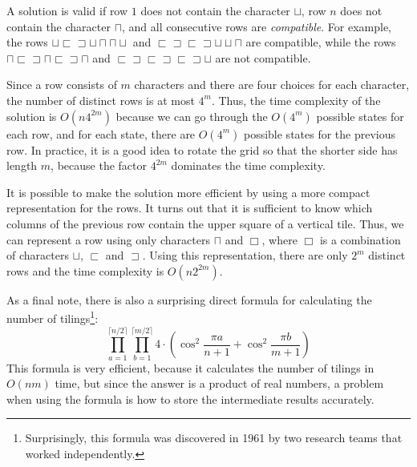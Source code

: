 A solution is valid if row $1$ does not contain
the character $\sqcup$,
row $n$ does not contain the character $\sqcap$,
and all consecutive rows are \emph{compatible}.
For example, the rows
$\sqcup \sqsubset \sqsupset \sqcup \sqcap \sqcap \sqcup$ and
$\sqsubset \sqsupset \sqsubset \sqsupset \sqcup \sqcup \sqcap$ 
are compatible, while the rows
$\sqcap \sqsubset \sqsupset \sqcap \sqsubset \sqsupset \sqcap$ and
$\sqsubset \sqsupset \sqsubset \sqsupset \sqsubset \sqsupset \sqcup$
are not compatible.

Since a row consists of $m$ characters and there are
four choices for each character, the number of distinct
rows is at most $4^m$.
Thus, the time complexity of the solution is
$O(n 4^{2m})$ because we can go through the
$O(4^m)$ possible states for each row,
and for each state, there are $O(4^m)$
possible states for the previous row.
In practice, it is a good idea to rotate the grid
so that the shorter side has length $m$,
because the factor $4^{2m}$ dominates the time complexity.

It is possible to make the solution more efficient
by using a more compact representation for the rows.
It turns out that it is sufficient to know which
columns of the previous row contain the upper square
of a vertical tile.
Thus, we can represent a row using only characters
$\sqcap$ and $\Box$, where $\Box$ is a combination
of characters
$\sqcup$, $\sqsubset$ and $\sqsupset$.
Using this representation, there are only
$2^m$ distinct rows and the time complexity is
$O(n 2^{2m})$.

As a final note, there is also a surprising direct formula
for calculating the number of tilings\footnote{Surprisingly,
this formula was discovered in 1961 by two research teams \cite{kas61,tem61}
that worked independently.}:
\[ \prod_{a=1}^{\lceil n/2 \rceil} \prod_{b=1}^{\lceil m/2 \rceil} 4 \cdot (\cos^2 \frac{\pi a}{n + 1} + \cos^2 \frac{\pi b}{m+1})\]
This formula is very efficient, because it calculates
the number of tilings in $O(nm)$ time,
but since the answer is a product of real numbers,
a problem when using the formula is
how to store the intermediate results accurately.


